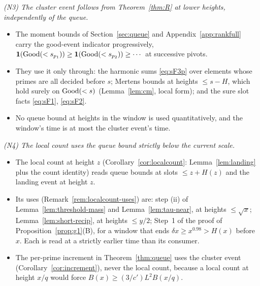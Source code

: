 \emph{(N3) The cluster event follows from Theorem~\ref{thm:R} at lower heights, independently of the queue.}
\begin{itemize}
\item The moment bounds of Section~\ref{sec:queue} and Appendix~\ref{app:rankfull} carry the good-event indicator progressively,
$\mathbf 1(\mathrm{Good}(<s_{p_1}))\ge\mathbf 1(\mathrm{Good}(<s_{p_2}))\ge\cdots$ at successive pivots.
\item They use it only through: the harmonic sums \ref{eq:sF3p} over elements whose primes are all decided before $s$; Mertens
bounds at heights $\le s-H$, which hold surely on $\mathrm{Good}(<s)$ (Lemma~\ref{lem:cm}, local form); and the sure slot facts
\ref{eq:sF1}, \ref{eq:sF2}.
\item No queue bound at heights in the window is used quantitatively, and the window's time is at most the cluster event's time.
\end{itemize}

\emph{(N4) The local count uses the queue bound strictly below the current scale.}
\begin{itemize}
\item The local count at height $z$ (Corollary~\ref{cor:localcount}: Lemma~\ref{lem:landing} plus the count identity) reads queue
bounds at slots $\le z+H(z)$ and the landing event at height $z$.
\item Its uses (Remark~\ref{rem:localcount-uses}) are: step (ii) of Lemma~\ref{lem:threshold-mass} and Lemma~\ref{lem:tau-near},
at heights $\le\sqrt x$; Lemma~\ref{lem:short-recip}, at heights $\le y/2$; Step~1 of the proof of Proposition~\ref{prop:g1}(B),
for a window that ends $\delta x\ge x^{0.98}>H(x)$ before $x$. Each is read at a strictly earlier time than its consumer.
\item The per-prime increment in Theorem~\ref{thm:queue} uses the cluster event (Corollary~\ref{cor:increment}), never the local
count, because a local count at height $x/q$ would force $B(x)\ge(3/c')L^2B(x/q)$.
\end{itemize}

